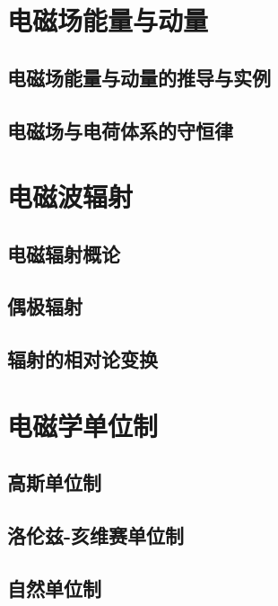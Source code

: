 \section{电磁场能量与动量}

\subsection{电磁场能量与动量的推导与实例}

\subsection{电磁场与电荷体系的守恒律}

\section{电磁波辐射}

\subsection{电磁辐射概论}

\subsection{偶极辐射}

\subsection{辐射的相对论变换}

\section{电磁学单位制}

\subsection{高斯单位制}

\subsection{洛伦兹-亥维赛单位制}

\subsection{自然单位制}